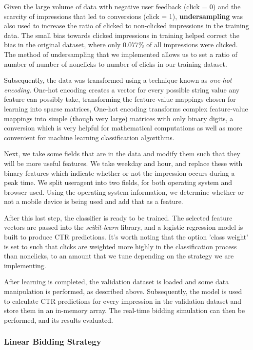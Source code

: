 \documentclass{sig-alternate-05-2015}
\begin{document}
Given the large volume of data with negative user feedback (click = 0) and the scarcity of impressions that led to conversions (click = 1), \textbf{undersampling} was also used to increase the ratio of clicked to non-clicked impressions in the training data. The small bias towards clicked impressions in training helped correct the bias in the original dataset, where only 0.077\% of all impressions were clicked. The method of undersampling that we implemented allows us to set a ratio of number of number of nonclicks to number of clicks in our training dataset.

Subsequently, the data was transformed using a technique known as \textit{one-hot encoding}. One-hot encoding creates a vector for every possible string value any feature can possibly take, transforming the feature-value mappings chosen for learning into sparse matrices, One-hot encoding transforms complex feature-value mappings into simple (though very large) matrices with only binary digits, a conversion which is very helpful for mathematical computations as well as more convenient for machine learning classification algorithms.

Next, we take some fields that are in the data and modify them such that they will be more useful features. We take weekday and hour, and replace these with binary features which indicate whether or not the impression occurs during a peak time. We split useragent into two fields, for both operating system and browser used. Using the operating system information, we determine whether or not a mobile device is being used and add that as a feature.

After this last step, the classifier is ready to be trained. The selected feature vectors are passed into the \textit{scikit-learn} library, and a logistic regression model is built to produce CTR predictions. It's worth noting that the option 'class weight' is set to such that clicks are weighted more highly in the classification process than nonclicks, to an amount that we tune depending on the strategy we are implementing.

After learning is completed, the validation dataset is loaded and some data manipulation is performed, as described above. Subsequently, the model is used to calculate CTR predictions for every impression in the validation dataset and store them in an in-memory array. The real-time bidding simulation can then be performed, and its results evaluated.

\subsubsection{Linear Bidding Strategy}
\end{document}
